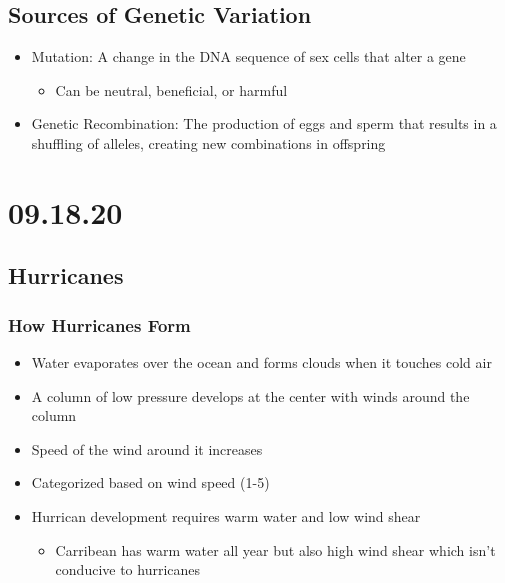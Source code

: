 \documentclass[11pt]{article}
\begin{document}
\subsection{Sources of Genetic Variation}
\label{sec:org34b34f6}
\begin{itemize}
\item Mutation: A change in the DNA sequence of sex cells that alter a gene
\begin{itemize}
\item Can be neutral, beneficial, or harmful
\end{itemize}
\item Genetic Recombination: The production of eggs and sperm that results in a shuffling of 
alleles, creating new combinations in offspring
\end{itemize}
\section{09.18.20}
\label{sec:org167af08}
\subsection{Hurricanes}
\label{sec:orgf1d4d09}
\subsubsection{How Hurricanes Form}
\label{sec:org4f73e10}
\begin{itemize}
\item Water evaporates over the ocean and forms clouds when it touches cold air
\item A column of low pressure develops at the center with winds around the column
\item Speed of the wind around it increases
\end{itemize}
\begin{itemize}
\item Categorized based on wind speed (1-5)
\item Hurrican development requires warm water and low wind shear
\begin{itemize}
\item Carribean has warm water all year but also high wind shear which isn't conducive to hurricanes
\end{itemize}
\end{itemize}
\end{document}

